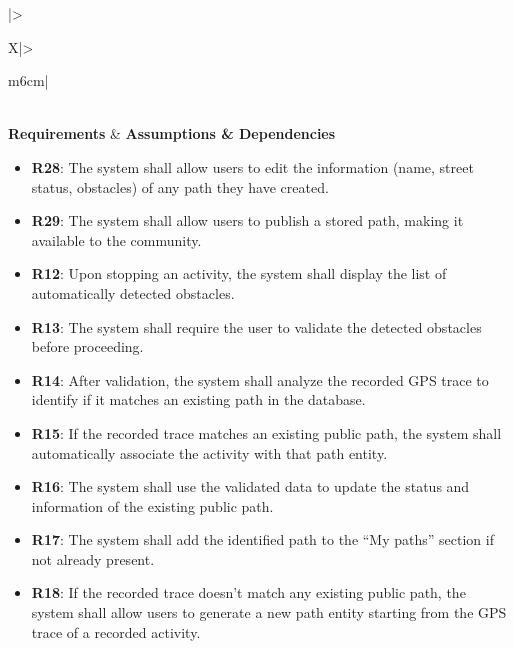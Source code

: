 \begin{table}[H]
    \centering
    \renewcommand{\arraystretch}{1.3}
    \begin{tabularx}{\textwidth}{|>{\raggedright\arraybackslash}X|>{\raggedright\arraybackslash}m{6cm}|}
        \hline
         \\ \hline
        \centering\textbf{Requirements} & \centering\textbf{Assumptions \& Dependencies} \tabularnewline \hline
        
        \begin{minipage}[t]{\linewidth}
        \begin{itemize}[leftmargin=*, nosep, label={}]
            \item \textbf{R28}: The system shall allow users to edit the information (name, street status, obstacles) of any path they have created.
            \item \textbf{R29}: The system shall allow users to publish a stored path, making it available to the community.
            \item \textbf{R12}: Upon stopping an activity, the system shall display the list of automatically detected obstacles.
            \item \textbf{R13}: The system shall require the user to validate the detected obstacles before proceeding.
            \item \textbf{R14}: After validation, the system shall analyze the recorded GPS trace to identify if it matches an existing path in the database.
            \item \textbf{R15}: If the recorded trace matches an existing public path, the system shall automatically associate the activity with that path entity.
            \item \textbf{R16}: The system shall use the validated data to update the status and information of the existing public path.
            \item \textbf{R17}: The system shall add the identified path to the “My paths” section if not already present.
            \item \textbf{R18}: If the recorded trace doesn't match any existing public path, the system shall allow users to generate a new path entity starting from the GPS trace of a recorded activity.

\end{itemize}
\end{minipage}
\end{tabularx}
\end{table}
